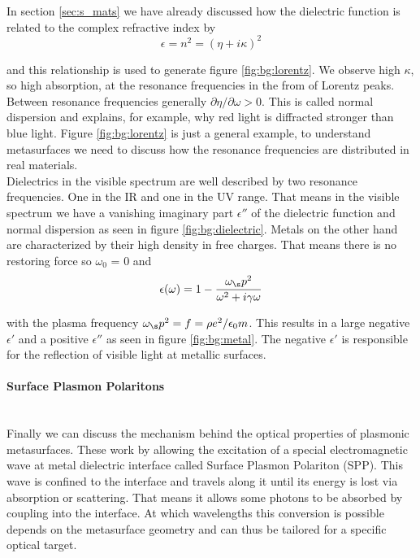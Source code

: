 In section \ref{sec:s_mats} we have already discussed how the dielectric function is related to the complex refractive index by
\begin{equation}
    \epsilon = n^2 = (\eta + i \kappa)^2
\end{equation}

and this relationship is used to generate figure \ref{fig:bg:lorentz}. We observe high $\kappa$, so high absorption, at the resonance frequencies in the from of Lorentz peaks. Between resonance frequencies generally 
$\partial \eta / \partial \omega > 0$.
This is called normal dispersion and explains, for example, why red light is diffracted stronger than blue light.
Figure \ref{fig:bg:lorentz} is just a general example, to understand metasurfaces we need to discuss how the resonance frequencies are distributed in real materials.
\\

\indent
Dielectrics in the visible spectrum are well described by two resonance frequencies. One in the IR and one in the UV range. That means in the visible spectrum we have a vanishing imaginary part $\epsilon''$ of the dielectric function and normal dispersion as seen in figure \ref{fig:bg:dielectric}. 
Metals on the other hand are characterized by their high density in free charges. That means there is no restoring force so 
$\omega_0$ = 0 and
\begin{equation}
    \epsilon(\omega) = 1 - \frac{\omega_\s p^2}{\omega^2 + i \gamma \omega}
\end{equation}

with the plasma frequency 
$\omega_\s p^2 = f = \rho e^2 / \epsilon_0 m$.
This results in a large negative $\epsilon'$ and a positive $\epsilon''$ as seen in figure \ref{fig:bg:metal}. The negative $\epsilon'$ is responsible for the reflection of visible light at metallic surfaces.

\paragraph{Surface Plasmon Polaritons}~\\
Finally we can discuss the mechanism behind the optical properties of plasmonic metasurfaces. These work by allowing the excitation of a special electromagnetic wave at metal dielectric interface called Surface Plasmon Polariton (SPP). This wave is confined to the interface and travels along it until its energy is lost via absorption or scattering. That means it allows some photons to be absorbed by coupling into the interface. At which wavelengths this conversion is possible depends on the metasurface geometry and can thus be tailored for a specific optical target.

